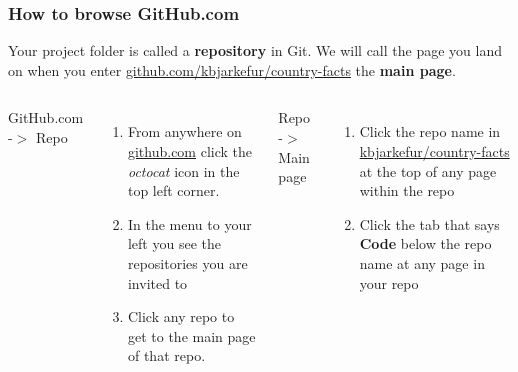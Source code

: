 \documentclass[aspectratio=169]{beamer} %
\newcommand{\trainingURL}[1]{{\color{blue}\url{#1}}}
\newcommand{\traininerUsername}{kbjarkefur}
\newcommand{\repoName}{\traininerUsername/country-facts}
\newcommand{\trainingRepoURL}[1]{\trainingURL{github.com/\repoName #1}}
\begin{document}
\begin{frame}
	\frametitle{How to browse GitHub.com}
	
	Your project folder is called a \textbf{repository} in Git. We will call the page you land on when you enter \trainingRepoURL{} the \textbf{main page}.
	
	\vspace{.5cm}
	
	\begin{columns}[T] 
		
		GitHub.com -$>$ Repo
		\begin{enumerate}
			\item From anywhere on \trainingURL{github.com} click the \textit{octocat} icon in the top left corner.
			\item In the menu to your left you see the repositories you are invited to
			\item Click any repo to get to the main page of that repo.
		\end{enumerate}
		
		Repo -$>$ Main page
		\begin{enumerate}
			\item Click the repo name in \trainingURL{\repoName} at the top of any page within the repo
			\item Click the tab that says \textbf{Code} below the repo name at any page in your repo
		\end{enumerate}
		
	\end{columns}
\end{frame}
\end{document}

